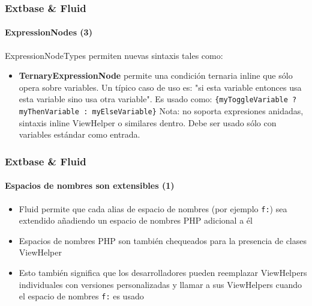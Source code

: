 \begin{frame}[fragile]
	\frametitle{Extbase \& Fluid}
	\framesubtitle{ExpressionNodes (3)}

	ExpressionNodeTypes permiten nuevas sintaxis tales como:

	\begin{itemize}

		\item \textbf{TernaryExpressionNode}\newline
			\small
				permite una condición ternaria inline que sólo opera sobre variables.
				Un típico caso de uso es: "si esta variable entonces usa esta variable sino usa
				otra variable". Es usado como:\newline
				\texttt{\{myToggleVariable ? myThenVariable : myElseVariable\}}\newline
				Nota: no soporta expresiones anidadas, sintaxis inline ViewHelper
				o similares dentro. Debe ser usado sólo con variables
				estándar como entrada.
			\normalsize

	\end{itemize}

\end{frame}


\begin{frame}[fragile]
	\frametitle{Extbase \& Fluid}
	\framesubtitle{Espacios de nombres son extensibles (1)}

	\begin{itemize}

		\item Fluid permite que cada alias de espacio de nombres (por ejemplo \texttt{f:}) sea
			extendido añadiendo un espacio de nombres PHP adicional a él

		\item Espacios de nombres PHP son también chequeados para la presencia de clases ViewHelper

		\item Esto también significa que los desarrolladores pueden reemplazar ViewHelpers individuales
			con versiones personalizadas y llamar a sus ViewHelpers cuando el
			espacio de nombres \texttt{f:} es usado
	\end{itemize}

\end{frame}


